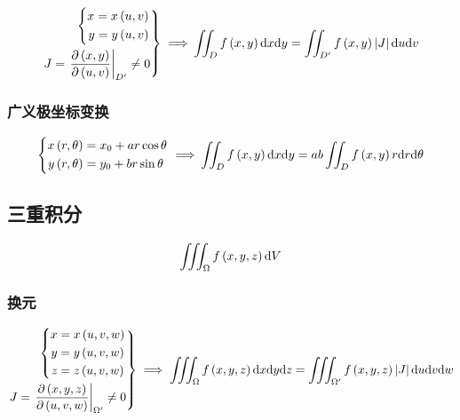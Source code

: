 \documentclass{article}
\begin{document}
\[\left.\begin{aligned}
        \left\{\begin{aligned}
                   x=x\left(u,v\right) \\
                   y=y\left(u,v\right)
               \end{aligned}\right. \\
        J=\left.\frac{\partial\left(x,y\right)}{\partial\left(u,v\right)}\right|_{D^\prime}\neq0
    \end{aligned}\right\}\implies\\
    \iint_Df\left(x,y\right)\mathrm d x\mathrm d y=
    \iint_{D^\prime}f\left(x,y\right)\left|J\right|\mathrm d u\mathrm d v\]

\subsubsection{广义极坐标变换}

\[\left\{\begin{aligned}
        x\left(r,\theta\right) & =x_0+ar\cos\theta \\
        y\left(r,\theta\right) & =y_0+br\sin\theta
    \end{aligned}\right.\implies\\
    \iint_Df\left(x,y\right)\mathrm d x\mathrm d y=
    ab\iint_Df\left(x,y\right)r\mathrm d r\mathrm d\theta\]

\subsection{三重积分}

\begin{definition}[$\d V=\d x\d y\d z$]
    \[\iiint_\Omega f\left(x,y,z\right)\mathrm d V\]
\end{definition}

\subsubsection{换元}

\[\left.\begin{aligned}
        \left\{\begin{aligned}
                   x & =x\left(u,v,w\right) \\
                   y & =y\left(u,v,w\right) \\
                   z & =z\left(u,v,w\right)
               \end{aligned}\right. \\
        J=\left.\frac{\partial\left(x,y,z\right)}{\partial\left(u,v,w\right)}\right|_{\Omega^\prime}\neq0
    \end{aligned}\right\}\implies
    \iiint_\Omega f\left(x,y,z\right)\mathrm d x\mathrm d y\mathrm d z=
    \iiint_{\Omega^\prime}f\left(x,y,z\right)\left|J\right|\mathrm d u\mathrm d v\mathrm d w\]
\end{document}

